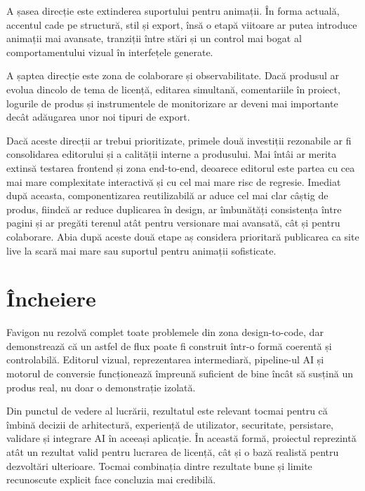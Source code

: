 A șasea direcție este extinderea suportului pentru animații. În forma actuală, accentul cade pe structură, stil și export, însă o etapă viitoare ar putea introduce animații mai avansate, tranziții între stări și un control mai bogat al comportamentului vizual în interfețele generate.

A șaptea direcție este zona de colaborare și observabilitate. Dacă produsul ar evolua dincolo de tema de licență, editarea simultană, comentariile în proiect, logurile de produs și instrumentele de monitorizare ar deveni mai importante decât adăugarea unor noi tipuri de export.

Dacă aceste direcții ar trebui prioritizate, primele două investiții rezonabile ar fi consolidarea editorului și a calității interne a produsului. Mai întâi ar merita extinsă testarea frontend și zona end-to-end, deoarece editorul este partea cu cea mai mare complexitate interactivă și cu cel mai mare risc de regresie. Imediat după aceasta, componentizarea reutilizabilă ar aduce cel mai clar câștig de produs, fiindcă ar reduce duplicarea în design, ar îmbunătăți consistența între pagini și ar pregăti terenul atât pentru versionare mai avansată, cât și pentru colaborare. Abia după aceste două etape aș considera prioritară publicarea ca site live la scară mai mare sau suportul pentru animații sofisticate.

\section{Încheiere}

Favigon nu rezolvă complet toate problemele din zona design-to-code, dar demonstrează că un astfel de flux poate fi construit într-o formă coerentă și controlabilă. Editorul vizual, reprezentarea intermediară, pipeline-ul AI și motorul de conversie funcționează împreună suficient de bine încât să susțină un produs real, nu doar o demonstrație izolată.

Din punctul de vedere al lucrării, rezultatul este relevant tocmai pentru că îmbină decizii de arhitectură, experiență de utilizator, securitate, persistare, validare și integrare AI în aceeași aplicație. În această formă, proiectul reprezintă atât un rezultat valid pentru lucrarea de licență, cât și o bază realistă pentru dezvoltări ulterioare. Tocmai combinația dintre rezultate bune și limite recunoscute explicit face concluzia mai credibilă.
